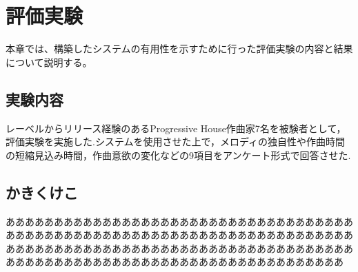 \chapter{評価実験}
本章では、構築したシステムの有用性を示すために行った評価実験の内容と結果について説明する。

\section{実験内容}
レーベルからリリース経験のあるProgressive House作曲家7名を被験者として，評価実験を実施した.システムを使用させた上で，メロディの独自性や作曲時間の短縮見込み時間，作曲意欲の変化などの9項目をアンケート形式で回答させた.


\section{かきくけこ}
あああああああああああああああああああああああああああああああああああああああああああああああああああああああああああああああああああああああああああああああああああああああああああああああああああああああああああああああああああああああああああああああああああああああああああああああ

